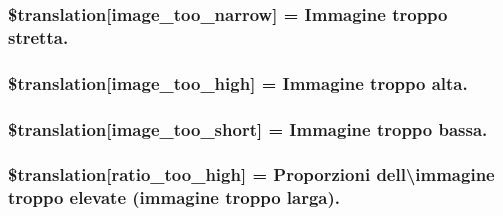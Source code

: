 \subsubsection[{\$translation}]{\setlength{\rightskip}{0pt plus 5cm}\$translation\mbox{[}\textquotesingle{}image\+\_\+too\+\_\+narrow\textquotesingle{}\mbox{]} = \textquotesingle{}Immagine troppo stretta.\textquotesingle{}}\label{class_8upload_8it___i_t_8php_a5c9a4cd67fd21c32e0a3b434591a6037}
\hypertarget{class_8upload_8it___i_t_8php_aa27bde361343f3b63c7cd441860024f8}{}
\subsubsection[{\$translation}]{\setlength{\rightskip}{0pt plus 5cm}\$translation\mbox{[}\textquotesingle{}image\+\_\+too\+\_\+high\textquotesingle{}\mbox{]} = \textquotesingle{}Immagine troppo alta.\textquotesingle{}}\label{class_8upload_8it___i_t_8php_aa27bde361343f3b63c7cd441860024f8}
\hypertarget{class_8upload_8it___i_t_8php_a86fcd4e1157b00032df451188d735527}{}
\subsubsection[{\$translation}]{\setlength{\rightskip}{0pt plus 5cm}\$translation\mbox{[}\textquotesingle{}image\+\_\+too\+\_\+short\textquotesingle{}\mbox{]} = \textquotesingle{}Immagine troppo bassa.\textquotesingle{}}\label{class_8upload_8it___i_t_8php_a86fcd4e1157b00032df451188d735527}
\hypertarget{class_8upload_8it___i_t_8php_a23396f6ce7f31e5e5f1b57580621d982}{}
\subsubsection[{\$translation}]{\setlength{\rightskip}{0pt plus 5cm}\$translation\mbox{[}\textquotesingle{}ratio\+\_\+too\+\_\+high\textquotesingle{}\mbox{]} = \textquotesingle{}Proporzioni dell\textbackslash{}\textquotesingle{}immagine troppo elevate (immagine troppo larga).\textquotesingle{}}\label{class_8upload_8it___i_t_8php_a23396f6ce7f31e5e5f1b57580621d982}
\hypertarget{class_8upload_8it___i_t_8php_ac533b9a479f056b0b8623e4268f068c2}{}
